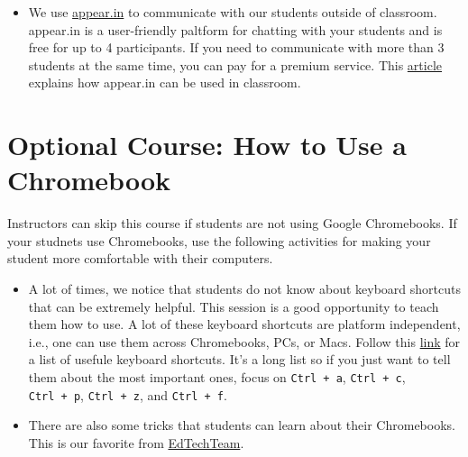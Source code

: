 \documentclass[]{book}
\begin{document}
\begin{itemize}
\item
  We use \href{www.appear.in}{appear.in} to communicate with our students outside of classroom. appear.in is a user-friendly paltform for chatting with your students and is free for up to 4 participants. If you need to communicate with more than 3 students at the same time, you can pay for a premium service. This \href{https://appear.in/information/education/rachelle-poth/}{article} explains how appear.in can be used in classroom.
\end{itemize}

\hypertarget{chromebook}{%
\chapter*{Optional Course: How to Use a Chromebook}\label{chromebook}}

Instructors can skip this course if students are not using Google Chromebooks. If your studnets use Chromebooks, use the following activities for making your student more comfortable with their computers.

\begin{itemize}
\item
  A lot of times, we notice that students do not know about keyboard shortcuts that can be extremely helpful. This session is a good opportunity to teach them how to use. A lot of these keyboard shortcuts are platform independent, i.e., one can use them across Chromebooks, PCs, or Macs. Follow this \href{https://www.thegeekstuff.com/2016/04/chromebook-keyboard-shortcuts/}{link} for a list of usefule keyboard shortcuts. It's a long list so if you just want to tell them about the most important ones, focus on \texttt{Ctrl\ +\ a}, \texttt{Ctrl\ +\ c}, \texttt{Ctrl\ +\ p}, \texttt{Ctrl\ +\ z}, and \texttt{Ctrl\ +\ f}.
\item
  There are also some tricks that students can learn about their Chromebooks. This is our favorite from \href{https://twitter.com/edtechteam}{EdTechTeam}.
\end{itemize}
\end{document}
